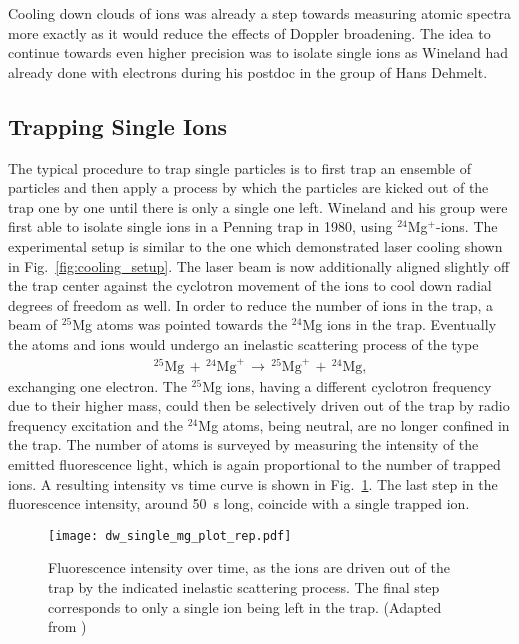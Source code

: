 Cooling down clouds of ions was already a step towards measuring atomic spectra
more exactly as it would reduce the effects of Doppler broadening. The idea to
continue towards even higher precision was to isolate single ions as Wineland
had already done with electrons during his postdoc in the group of Hans Dehmelt.


\subsection{Trapping Single Ions}
The typical procedure to trap single particles is to first trap an ensemble of
particles and then apply a process by which the particles are kicked out of the
trap one by one until there is only a single one left. Wineland and his group
were first able to isolate single ions in a Penning trap in 1980, using 
$^{24}$Mg$^+$-ions. The experimental setup is similar to the one which
demonstrated
laser cooling shown in Fig.~\ref{fig:cooling_setup}. The laser beam is now
additionally aligned slightly off the trap center against the cyclotron movement
of the ions to cool down radial degrees of freedom as well. In order to reduce the
number of ions in the trap, a beam of $^{25}$Mg atoms was pointed towards the
$^{24}$Mg ions in the trap. Eventually the atoms and ions would undergo an
inelastic scattering process of the type
\begin{align}
  \label{eq:inel_scat}
  \,^{25}\text{Mg}\, + \,^{24}\text{Mg}^+ \,\longrightarrow\, ^{25}\text{Mg}^+ \,+
  \,^{24}\text{Mg},
\end{align}
exchanging one electron. The $^{25}$Mg ions, having a different cyclotron
frequency due to their higher mass, could then be selectively driven out of the
trap by radio frequency excitation and the $^{24}$Mg atoms, being neutral, are
no longer confined in the trap. The number of atoms is surveyed by measuring the
intensity of the emitted fluorescence light, which is again proportional to the
number of trapped ions. A resulting intensity vs time curve is shown in
Fig.~\ref{fig:dw_single_mg_plot_rep}. The last step in the fluorescence
intensity, around \SI{50}{\second} long, coincide with a single trapped ion.
\begin{figure}[t]
  \centering
  \texttt{[image: dw\_single\_mg\_plot\_rep.pdf]}
  \caption{Fluorescence intensity over time, as the ions are driven out of the
  trap by the indicated inelastic scattering process. The final step corresponds
  to only a single ion being left in the trap. (Adapted from
  \cite{wineland1981spectroscopy})}
  \label{fig:dw_single_mg_plot_rep}
\end{figure}

